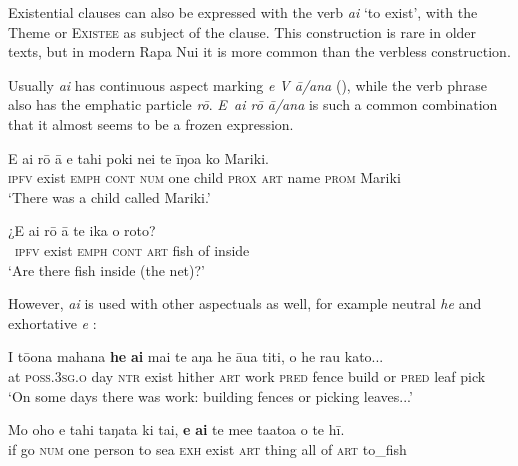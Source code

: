 Existential clauses can also be expressed with the verb \textit{ai} ‘to exist’, with the Theme or \textsc{Existee} as subject of the clause. This construction is rare in older texts, but in modern Rapa Nui it is more common than the verbless construction.

Usually \textit{ai} has continuous aspect marking \textit{e V {\ꞌ}ā}\textit{/{\ꞌ}ana} (), while the verb phrase also has the emphatic particle \textit{rō}. \textit{E~ai rō {\ꞌ}ā/{\ꞌ}ana} is such a common combination that it almost seems to be a frozen expression. 

\ea\label{ex:9.62}
\gll E ai rō {\ꞌ}ā e tahi poki nei te {\ꞌ}īŋoa ko Mariki. \\
\textsc{ipfv} exist \textsc{emph} \textsc{cont} \textsc{num} one child \textsc{prox} \textsc{art} name \textsc{prom} Mariki \\

\glt 
‘There was a child called Mariki.’ \textstyleExampleref{[R380.001]} 
\z

\ea\label{ex:9.63}
\gll ¿E ai rō {\ꞌ}ā te ika o roto? \\
~\textsc{ipfv} exist \textsc{emph} \textsc{cont} \textsc{art} fish of inside \\

\glt
‘Are there fish inside (the net)?’ \textstyleExampleref{[R241.058]} 
\z

However, \textit{ai} is used with other aspectuals as well, for example neutral \textit{he}  and exhortative \textit{e} :

\ea\label{ex:9.64}
\gll {\ꞌ}I tō{\ꞌ}ona mahana \textbf{he} \textbf{ai} mai te aŋa he {\ꞌ}āua titi, {\ꞌ}o he rau kato...\\
at \textsc{poss.3sg.o} day \textsc{ntr} exist hither \textsc{art} work \textsc{pred} fence build or \textsc{pred} leaf pick\\

\glt 
‘On some days there was work: building fences or picking leaves...’ \textstyleExampleref{[R380.084]} 
\z

\ea\label{ex:9.65}
\gll Mo oho e tahi taŋata ki tai, \textbf{e} \textbf{ai} te me{\ꞌ}e ta{\ꞌ}ato{\ꞌ}a o te hī. \\
if go \textsc{num} one person to sea \textsc{exh} exist \textsc{art} thing all of \textsc{art} to\_fish \\

